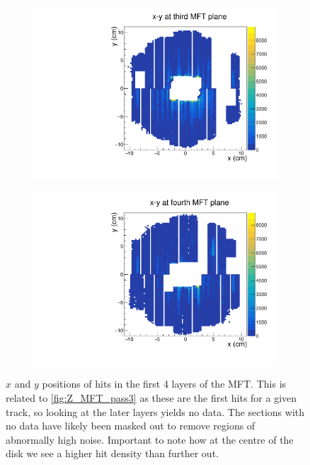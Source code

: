 \begin{figure}[H]
\begin{subfigure}[t]{.45\linewidth}
        \includegraphics[width=\linewidth]{Plots/pass3_MFT/x_y_3_pass3.pdf}
        \caption{}
        \label{fig:x_y_3_pass3}
    \end{subfigure}
    \hfill
    \begin{subfigure}[t]{.45\linewidth}
        \centering
        \includegraphics[width=\linewidth]{Plots/pass3_MFT/x_y_4_pass3.pdf}
        \caption{}
        \label{fig:x_y_4_pass3}
    \end{subfigure}
\caption{$x$ and $y$ positions of hits in the first 4 layers of the MFT. This is related to \cref{fig:Z_MFT_pass3} as these are the first hits for a given track, so looking at the later layers yields no data. The sections with no data have likely been masked out to remove regions of abnormally high noise. Important to note how at the centre of the disk we see a higher hit density than further out.}
\label{fig:MFT_x_y_pass3}
\end{figure}

